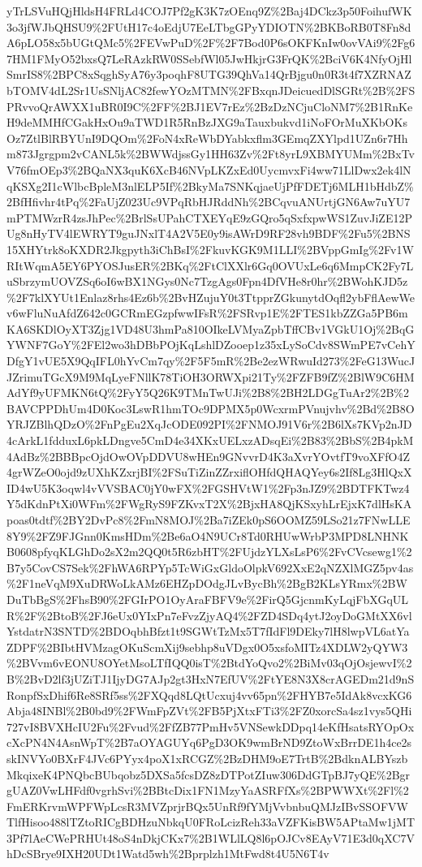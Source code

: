 \documentclass[11pt]{article}
\begin{document}
yTrLSVuHQjHldsH4FRLd4COJ7Pf2gK3K7zOEnq9Z\%2Baj4DCkz3p50FoihufWK3o3jfWJbQHSU9\%2FUtH17c4oEdjU7EeLTbgGPyYDIOTN\%2BKBoRB0T8Fn8dA6pLO58x5bUGtQMc5\%2FEVwPuD\%2F\%2F7Bod0P6sOKFKnIw0ovVAi9\%2Fg67HM1FMyO52bxsQ7LeRAzkRW0SSebfWl05JwHkjrG3FrQK\%2BciV6K4NfyOjHlSmrIS8\%2BPC8xSqghSyA76y3poqhF8UTG39QhVa14QrBjgu0n0R3t4f7XZRNAZbTOMV4dL2Sr1UsSNljAC82fewYOzMTMN\%2FBxqnJDeicuedDlSGRt\%2B\%2FSPRvvoQrAWXX1uBR0I9C\%2FF\%2BJ1EV7rEz\%2BzDzNCjuCloNM7\%2B1RnKeH9deMMHfCGakHxOu9aTWD1R5RnBzJXG9aTauxbukvd1iNoFOrMuXKbOKsOz7ZtlBlRBYUnI9DQOm\%2FoN4xReWbDYabkxflm3GEmqZXYlpd1UZn6r7Hhm873Jgrgpm2vCANL5k\%2BWWdjssGy1HH63Zv\%2Ft8yrL9XBMYUMm\%2BxTvV76fmOEp3\%2BQaNX3quK6XcB46NVpLKZxEd0UycmvxFi4ww71LlDwx2ek4lNqKSXg2I1cWlbcBpleM3nlELP5If\%2BkyMa7SNKqjaeUjPfFDETj6MLH1bHdbZ\%2BfHfivhr4tPq\%2FaUjZ023Uc9VPqRbHJRddNh\%2BCqvuANUrtjGN6Aw7uYU7mPTMWzrR4zsJhPec\%2BrlSsUPahCTXEYqE9zGQro5qSxfxpwWS1ZuvJiZE12PUg8nHyTV4lEWRYT9guJNxlT4A2V5E0y9isAWrD9RF28vh9BDF\%2Fu5\%2BNS15XHYtrk8oKXDR2Jkgpyth3iChBsI\%2FkuvKGK9M1LLI\%2BVppGmIg\%2Fv1WRItWqmA5EY6PYOSJusER\%2BKq\%2FtClXXlr6Gq0OVUxLe6q6MmpCK2Fy7LuSbrzymUOVZSq6oI6wBX1NGys0Nc7TzgAgs0Fpn4DfVHe8r0hr\%2BWohKJD5z\%2F7klXYUt1Enlaz8rhs4Ez6b\%2BvHZujuY0t3TtpprZGkunytdOqfl2ybFflAewWev6wFluNuAfdZ642c0GCRmEGzpfwwIFsR\%2FSRvp1E\%2FTES1kbZZGa5PB6mKA6SKDlOyXT3Zjg1VD48U3hmPa810OIkeLVMyaZpbTffCBv1VGkU1Oj\%2BqGYWNF7GoY\%2FEl2wo3hDBbPOjKqLshlDZooep1z35xLySoCdv8SWmPE7vCehYDfgY1vUE5X9QqIFL0hYvCm7qy\%2F5F5mR\%2Be2ezWRwuId273\%2FeG13WucJJZrimuTGcX9M9MqLyeFNllK78TiOH3ORWXpi21Ty\%2FZFB9fZ\%2BlW9C6HMAdYf9yUFMKN6tQ\%2FyY5Q26K9TMnTwUJi\%2B8\%2BH2LDGgTuAr2\%2B\%2BAVCPPDhUm4D0Koc3LswR1hmTOc9DPMX5p0WcxrmPVnujvhv\%2Bd\%2B8OYRJZBlhQDzO\%2FnPgEu2XqJcODE092PI\%2FNMOJ91V6r\%2B6lXs7KVp2nJD4cArkL1fdduxL6pkLDngve5CmD4e34XKxUELxzADsqEi\%2B83\%2BbS\%2B4pkM4AdBz\%2BBBpcOjdOwOVpDDVU8wHEn9GNvvrD4K3aXvrYOvtfT9voXFfO4Z4grWZeO0ojd9zUXhKZxrjBI\%2FSuTiZinZZrxiflOHfdQHAQYey6s2If8Lg3HlQxXID4wU5K3oqwl4vVVSBAC0jY0wFX\%2FGSHVtW1\%2Fp3nJZ9\%2BDTFKTwz4Y5dKdnPtXi0WFm\%2FWgRyS9FZKvxT2X\%2BjxHA8QjKSxyhLrEjxK7dlHsKApoas0tdtf\%2BY2DvPc8\%2FmN8MOJ\%2Ba7iZEk0pS6OOMZ59LSo21z7FNwLLE8Y9\%2FZ9FJGnn0KmsHDm\%2Be6aO4N9UCr8Td0RHUwWrbP3MPD8LNHNKB0608pfyqKLGhDo2sX2m2QQ0t5R6zbHT\%2FUjdzYLXsLsP6\%2FvCVcsewg1\%2B7y5CovCS7Sek\%2FhWA6RPYp5TcWiGxGldoOlpkV692XxE2qNZXlMGZ5pv4as\%2F1neVqM9XuDRWoLkAMz6EHZpDOdgJLvBycBh\%2BgB2KLsYRmx\%2BWDuTbBgS\%2FhsB90\%2FGIrPO1OyAraFBFV9e\%2FirQ5GjcnmKyLqjFbXGqULR\%2F\%2BtoB\%2FJ6eUx0YIxPn7eFvzZjyAQ4\%2FZD4SDq4ytJ2oyDoGMtXX6vlYstdatrN3SNTD\%2BDOqbhBfzt1t9SGWtTzMx5T7fIdFl9DEky7lH8lwpVL6atYaZDPF\%2BIbtHVMzagOKuScmXij9sebhp8uVDgx0O5xsfoMITz4XDLW2yQYW3\%2BVvm6vEONU8OYetMsoLTfIQQ0isT\%2BtdYoQvo2\%2BiMv03qOjOsjewvI\%2B\%2BvD2lf3jUZiTJ1IjyDG7AJp2gt3HxN7EfUV\%2FtYE8N3X8crAGEDm21d9nSRonpfSxDhif6Re8SRf5ss\%2FXQqd8LQtUcxuj4vv65pn\%2FHYB7e5IdAk8vcxKG6Abja48INBl\%2B0bd9\%2FWmFpZVt\%2FB5PjXtxFTi3\%2FZ0xorcSa4sz1vys5QHi727vI8BVXHcIU2Fu\%2Fvud\%2FfZB77PmHv5VNSewkDDpq14eKfHsatsRYOpOxcXcPN4N4AsnWpT\%2B7aOYAGUYq6PgD3OK9wmBrND9ZtoWxBrrDE1h4ce2sskINVYo0BXrF4JVc6PYyx4poX1xRCGZ\%2BzDHM9oE7TrtB\%2BdknALBYszbMkqixeK4PNQbcBUbqobz5DXSa5fcsDZ8zDTPotZIuw306DdGTpBJ7yQE\%2BgrgUAZ0VwLHFdf0vgrhSvi\%2BBtcDix1FN1MzyYaASRFfXs\%2BPWWXt\%2Fl\%2FmERKrvmWPFWpLcsR3MVZprjrBQx5UnRf9fYMjVvbnbuQMJzIBvSSOFVWTlfHisoo488lTZtoRICgBDHzuNbkqU0FRoLcizReh33aVZFKisBW5APtaMw1jMT3Pf7lAeCWePRHUt48oS4nDkjCKx7\%2B1WLlLQ8l6pOJCv8EAyV71E3d0qXC7VhDcSBrye9IXH20UDt1Watd5wh\%2Bprplzh1MtFwd8t4U5N6T4v
\end{document}
